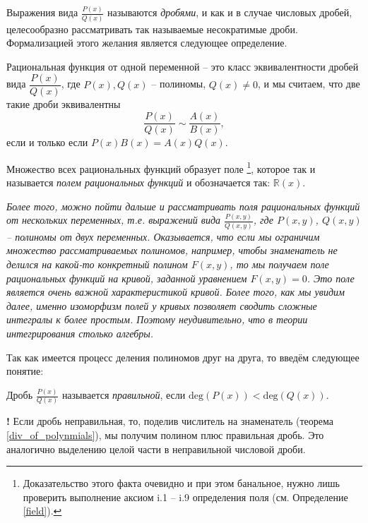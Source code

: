 Выражения вида $\frac{P(x)}{Q(x)}$ называются \textit{дробями}, и как и в случае числовых дробей, целесообразно рассматривать так называемые несократимые дроби. Формализацией этого желания является следующее определение. 

\begin{definition}
    Рациональная функция от одной переменной -- это класс эквивалентности дробей вида $\dfrac{P(x)}{Q(x)}$, где $P(x), Q(x)$ -- полиномы, $Q(x) \ne 0$, и мы считаем, что две такие дроби эквивалентны
    \[
     \frac{P(x)}{Q(x)} \sim \frac{A(x)}{B(x)},
    \]
    если и только если $P(x) B(x) = A(x) Q(x).$
\end{definition}

Множество всех рациональных функций образует поле \footnote{Доказательство этого факта очевидно и при этом банальное, нужно лишь проверить выполнение аксиом i.1 -- i.9 определения поля (см. Определение \ref{field}).}, которое так и называется \textit{полем рациональных функций} и обозначается так: $\mathbb{R}(x).$

\begin{remark}\textit{
  Более того, можно пойти дальше и рассматривать поля рациональных функций от нескольких переменных, \textit{т.е.} выражений вида $\frac{P(x,y)}{Q(x,y)}$, где $P(x,y)$, $Q(x,y)$ -- полиномы от двух переменных. Оказывается, что если мы ограничим множество рассматриваемых полиномов, например, чтобы знаменатель не делился на какой-то конкретный полином $F(x,y)$, то мы получаем поле рациональных функций на кривой, заданной уравнением $F(x,y)=0$. Это поле является очень важной характеристикой кривой. Более того, как мы увидим далее, именно изоморфизм полей у кривых позволяет сводить сложные интегралы к более простым. Поэтому неудивительно, что в теории интегрирования столько алгебры. }   
\end{remark}

Так как имеется процесс деления полиномов друг на друга, то введём следующее понятие:

\begin{definition}
    Дробь $\frac{P(x)}{Q(x)}$ называется \textit{правильной}, если $\mathrm{deg}(P(x)) < \mathrm{deg}(Q(x))$.
\end{definition}

\begin{mydanger}{\bf !}
    Если дробь неправильная, то, поделив числитель на знаменатель (теорема \ref{div_of_polynmials}), мы получим полином плюс правильная дробь. Это аналогично выделению целой части в неправильной числовой дроби.
\end{mydanger}


